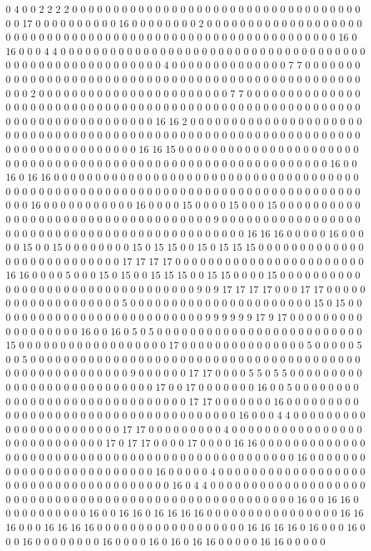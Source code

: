 0 4 0 0 2 2 2 2 0 0 0 0 0 0 0 0 0 0 0 0 0 0 0 0 0 0 0 0 0 0 0 0 0 0 0 0 0 0 0 0 0 0 0 0 0 17 0 0 0 0 0 0 0 0 0 0 16 0 0 0 0 0 0 0 0 2 0 0 0 0 0 0 0 0 0 0 0 0 0 0 0 0 0 0 0 0 0 0 0 0 0 0 0 0 0 0 0 0 0 0 0 0 0 0 0 0 0 0 0 0 0 0 0 0 0 0 0 0 0 0 0 0 0 0 0 16 0 16 0 0 0 4 4 0 0 0 0 0 0 0 0 0 0 0 0 0 0 0 0 0 0 0 0 0 0 0 0 0 0 0 0 0 0 0 0 0 0 0 0 0 0 0 0 0 0 0 0 0 0 0 0 0 0 0 0 0 0 0 0 4 0 0 0 0 0 0 0 0 0 0 0 0 0 0 7 7 0 0 0 0 0 0 0 0 0 0 0 0 0 0 0 0 0 0 0 0 0 0 0 0 0 0 0 0 0 0 0 0 0 0 0 0 0 0 0 0 0 0 0 0 0 0 0 0 0 0 0 0 0 2 0 0 0 0 0 0 0 0 0 0 0 0 0 0 0 0 0 0 0 0 0 0 0 7 7 0 0 0 0 0 0 0 0 0 0 0 0 0 0 0 0 0 0 0 0 0 0 0 0 0 0 0 0 0 0 0 0 0 0 0 0 0 0 0 0 0 0 0 0 0 0 0 0 0 0 0 0 0 0 0 0 0 0 0 0 0 0 0 0 0 0 0 0 0 0 0 0 0 0 0 16 16 2 0 0 0 0 0 0 0 0 0 0 0 0 0 0 0 0 0 0 0 0 0 0 0 0 0 0 0 0 0 0 0 0 0 0 0 0 0 0 0 0 0 0 0 0 0 0 0 0 0 0 0 0 0 0 0 0 0 0 0 0 0 0 0 0 0 0 0 0 0 0 0 0 0 0 0 0 0 0 0 0 16 16 15 0 0 0 0 0 0 0 0 0 0 0 0 0 0 0 0 0 0 0 0 0 0 0 0 0 0 0 0 0 0 0 0 0 0 0 0 0 0 0 0 0 0 0 0 0 0 0 0 0 0 0 0 0 0 0 0 0 0 0 0 0 16 0 0 16 0 16 16 0 0 0 0 0 0 0 0 0 0 0 0 0 0 0 0 0 0 0 0 0 0 0 0 0 0 0 0 0 0 0 0 0 0 0 0 0 0 0 0 0 0 0 0 0 0 0 0 0 0 0 0 0 0 0 0 0 0 0 0 0 0 0 0 0 0 0 0 0 0 0 0 0 0 0 0 0 0 0 0 0 0 0 16 0 0 0 0 0 0 0 0 0 0 0 16 0 0 0 0 15 0 0 0 0 15 0 0 0 15 0 0 0 0 0 0 0 0 0 0 0 0 0 0 0 0 0 0 0 0 0 0 0 0 0 0 0 0 0 0 0 0 0 0 0 9 0 0 0 0 0 0 0 0 0 0 0 0 0 0 0 0 0 0 0 0 0 0 0 0 0 0 0 0 0 0 0 0 0 0 0 0 0 0 0 0 0 0 0 0 0 0 16 16 16 0 0 0 0 0 16 0 0 0 0 0 15 0 0 15 0 0 0 0 0 0 0 0 15 0 15 15 0 0 15 0 15 15 15 0 0 0 0 0 0 0 0 0 0 0 0 0 0 0 0 0 0 0 0 0 0 0 0 0 0 0 17 17 17 17 0 0 0 0 0 0 0 0 0 0 0 0 0 0 0 0 0 0 0 0 0 0 0 16 16 0 0 0 0 5 0 0 0 15 0 15 0 0 15 15 15 0 0 15 15 0 0 0 0 15 0 0 0 0 0 0 0 0 0 0 0 0 0 0 0 0 0 0 0 0 0 0 0 0 0 0 0 0 0 0 0 0 0 9 0 9 17 17 17 17 0 0 0 17 17 0 0 0 0 0 0 0 0 0 0 0 0 0 0 0 0 0 0 0 5 0 0 0 0 0 0 0 0 0 0 0 0 0 0 0 0 0 0 0 0 0 0 15 0 15 0 0 0 0 0 0 0 0 0 0 0 0 0 0 0 0 0 0 0 0 0 0 0 0 0 0 9 9 9 9 9 9 17 9 17 0 0 0 0 0 0 0 0 0 0 0 0 0 0 0 0 0 0 16 0 0 16 0 5 0 5 0 0 0 0 0 0 0 0 0 0 0 0 0 0 0 0 0 0 0 0 0 0 0 0 0 15 0 0 0 0 0 0 0 0 0 0 0 0 0 0 0 0 0 0 17 0 0 0 0 0 0 0 0 0 0 0 0 0 0 0 5 0 0 0 0 0 5 0 0 5 0 0 0 0 0 0 0 0 0 0 0 0 0 0 0 0 0 0 0 0 0 0 0 0 0 0 0 0 0 0 0 0 0 0 0 0 0 0 0 0 0 0 0 0 0 0 0 0 0 0 0 0 0 0 0 9 0 0 0 0 0 0 17 17 0 0 0 0 5 5 0 5 5 0 0 0 0 0 0 0 0 0 0 0 0 0 0 0 0 0 0 0 0 0 0 0 0 0 0 0 17 0 0 17 0 0 0 0 0 0 0 16 0 0 5 0 0 0 0 0 0 0 0 0 0 0 0 0 0 0 0 0 0 0 0 0 0 0 0 0 0 0 0 0 0 17 17 0 0 0 0 0 0 0 16 0 0 0 0 0 0 0 0 0 0 0 0 0 0 0 0 0 0 0 0 0 0 0 0 0 0 0 0 0 0 0 0 0 0 0 0 0 16 0 0 0 4 4 0 0 0 0 0 0 0 0 0 0 0 0 0 0 0 0 0 0 0 0 0 0 0 17 17 0 0 0 0 0 0 0 0 0 4 0 0 0 0 0 0 0 0 0 0 0 0 0 0 0 0 0 0 0 0 0 0 0 0 0 0 0 0 17 0 17 17 0 0 0 0 17 0 0 0 0 16 16 0 0 0 0 0 0 0 0 0 0 0 0 0 0 0 0 0 0 0 0 0 0 0 0 0 0 0 0 0 0 0 0 0 0 0 0 0 0 0 0 0 0 0 0 0 0 0 0 16 0 0 0 0 0 0 0 0 0 0 0 0 0 0 0 0 0 0 0 0 0 0 0 0 0 16 0 0 0 0 0 4 0 0 0 0 0 0 0 0 0 0 0 0 0 0 0 0 0 0 0 0 0 0 0 0 0 0 0 0 0 0 0 0 0 0 0 0 0 0 16 0 4 4 0 0 0 0 0 0 0 0 0 0 0 0 0 0 0 0 0 0 0 0 0 0 0 0 0 0 0 0 0 0 0 0 0 0 0 0 0 0 0 0 0 0 0 0 0 0 0 0 0 0 0 0 0 0 16 0 0 16 16 0 0 0 0 0 0 0 0 0 0 0 16 0 0 16 16 0 16 16 16 16 0 0 0 0 0 0 0 0 0 0 0 0 0 0 0 0 16 16 16 0 0 0 16 16 16 16 0 0 0 0 0 0 0 0 0 0 0 0 0 0 0 0 0 0 16 16 16 16 0 16 0 0 0 16 0 0 0 16 0 0 0 0 0 0 0 0 16 0 0 0 0 16 0 16 0 16 16 0 0 0 0 0 16 16 0 0 0 0 0 